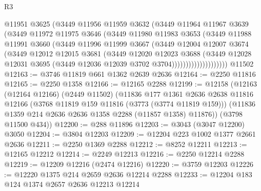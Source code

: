 \begin{lexlean}{R3}
\begin{coremodule}
                      @11951
                      @3625
                      (@3449
                        @11956
                        @11959
                        @3632
                        (@3449
                          @11964
                          @11967
                          @3639
                          (@3449
                            @11972
                            @11975
                            @3646
                            (@3449
                              @11980
                              @11983
                              @3653
                              (@3449
                                @11988
                                @11991
                                @3660
                                (@3449
                                  @11996
                                  @11999
                                  @3667
                                  (@3449
                                    @12004
                                    @12007
                                    @3674
                                    (@3449
                                      @12012
                                      @12015
                                      @3681
                                      (@3449
                                        @12020
                                        @12023
                                        @3688
                                        (@3449
                                          @12028
                                          @12031
                                          @3695
                                          (@3449 @12036 @12039 @3702 @3704))))))))))))))))))))
    @11502
@12163 := @3746 @11819 @661 @1362 @2639 @2636
@12164 := @2250 @11816
@12165 := @2250 @1358
@12166 := @12165 @2288
@12199 := @12158
    (@12163
      (@12164 @12166)
      (@2449 @11502)
      (@11836
        @177
        @1361
        @2636
        @2638
        @11816
        @12166
        (@3768 @11819 @159 @11816 (@3773 (@3774 @11819 @159)))
        (@11836 @1359 @214 @2636 @2636 @1358 @2288 (@11857 @1358) @11876))
      (@3798 @11500 @434))
@12200 := @288 @11896
@12203 := @3043 (@3047 @12200) @3050
@12204 := @3804 @12203
@12209 := @12204 @223 @1002 @1377 @2661 @2636
@12211 := @2250 @1369 @2288
@12212 := @8252 @12211
@12213 := @12165 @12212
@12214 := @2249 @12213
@12216 := @2250 @12214 @2288
@12219 := @12209 @12216 (@2474 @12216)
@12220 := @3759 @12203
@12226 := @12220 @1375 @214 @2659 @2636 @12214 @2288
@12233 := @12204 @183 @124 @1374 @2657 @2636 @12213 @12214

\end{coremodule}
\end{lexlean}
